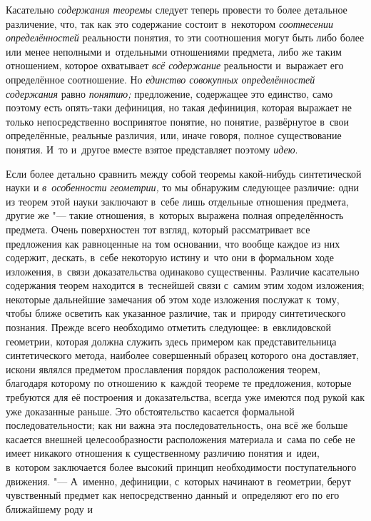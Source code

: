 Касательно {\em содержания
теоремы} следует теперь провести то более детальное
различение, что, так как это содержание состоит в~некотором
{\em соотнесении определённостей}
реальности понятия, то эти соотношения могут быть либо более
или менее неполными и~отдельными отношениями предмета, либо же таким
отношением, которое охватывает {\em всё
содержание} реальности и~выражает его определённое
соотношение. Но {\em единство совокупных
определённостей содержания} равно
{\em понятию;}
предложение, содержащее это единство, само поэтому есть
опять-таки дефиниция, но такая дефиниция, которая выражает не только
непосредственно воспринятое понятие, но понятие, развёрнутое в~свои
определённые, реальные различия, или, иначе говоря, полное существование
понятия. И~то и~другое вместе взятое представляет поэтому
{\em идею}.

Если более детально сравнить между собой теоремы какой-нибудь
синтетической науки и {\em в~особенности
геометрии,} то мы обнаружим следующее различие: одни из
теорем этой науки заключают в~себе лишь отдельные отношения предмета,
другие же "--- такие отношения, в~которых выражена полная
определённость предмета. Очень поверхностен тот взгляд, который
рассматривает все предложения как равноценные на том основании, что вообще
каждое из них содержит, дескать, в~себе некоторую истину и~что они в
формальном ходе изложения, в~связи доказательства одинаково существенны.
Различие касательно содержания теорем находится в~теснейшей связи с~самим
этим ходом изложения; некоторые дальнейшие замечания об этом ходе изложения
послужат к~тому, чтобы ближе осветить как указанное
различие, так и~природу синтетического познания. Прежде всего необходимо
отметить следующее: в~евклидовской геометрии, которая должна служить здесь
примером как представительница синтетического метода, наиболее совершенный
образец которого она доставляет, искони являлся предметом прославления
порядок расположения теорем, благодаря которому по отношению к~каждой
теореме те предложения, которые требуются для её построения и
доказательства, всегда уже имеются под рукой как уже доказанные раньше. Это
обстоятельство касается формальной последовательности; как ни важна эта
последовательность, она всё же больше касается внешней целесообразности
расположения материала и~сама по себе не имеет никакого отношения к
существенному различию понятия и~идеи, в~котором заключается более высокий
принцип необходимости поступательного движения. "--- А~именно,
дефиниции, с~которых начинают в~геометрии, берут чувственный предмет как
непосредственно данный и~определяют его по его ближайшему роду и
